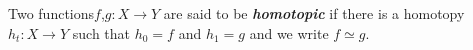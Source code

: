 \documentclass[preview]{standalone}
\begin{document}
\begin{center}
Two functions$f$,$g$$ : X\to Y$ are said to be \textbf{\textit{homotopic}} if there is a homotopy $h_t : X\to Y$ such that $h_0=$$f$ and $h_1=$$g$ and we write $f\simeq g$.
\end{center}
\end{document}
